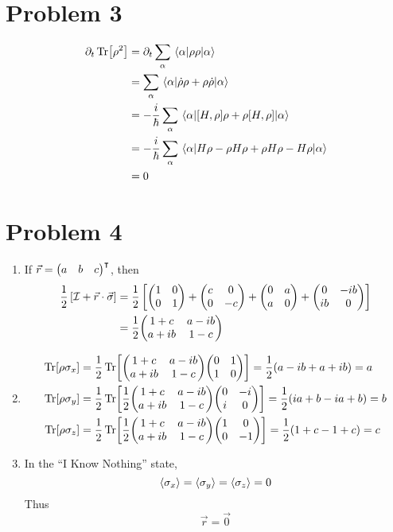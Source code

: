 \documentclass[12pt]{article}
\begin{document}
\section*{Problem 3}
\begin{align*}
    \partial_t \Tr[\rho^2] &= \partial_t\sum_\alpha \mel{\alpha}{\rho\rho}{\alpha} \\
    &= \sum_\alpha \mel{\alpha}{\dot{\rho}\rho + \rho\dot{\rho}}{\alpha} \\
    &= -\frac{i}{\hbar}\sum_\alpha \mel{\alpha}{\comm{H}{\rho}\rho + \rho\comm{H}{\rho}}{\alpha} \\
    &= -\frac{i}{\hbar}\sum_\alpha \mel{\alpha}{H\rho - \rho H \rho + \rho H \rho - H\rho}{\alpha} \\
    &= 0
\end{align*}


\section*{Problem 4}
\begin{enumerate}[label=(\alph*)]
    \item If $\vec{r} = \mqty(a&b&c)^\intercal$, then
    \begin{align*}
        \frac{1}{2}\left[\mathcal{I} + \vec{r}\cdot\vec{\sigma}\right] &= \frac{1}{2}\left[\mqty(1&0\\0&1) + \mqty(c&0\\0&-c) + \mqty(0&a\\a&0) + \mqty(0&-ib\\ib&0)\right] \\
        &= \frac{1}{2}\mqty(1+c & a-ib \\ a+ib & 1-c)
    \end{align*}

    \item
    \begin{align*}
        \Tr[\rho\sigma_x] &= \frac{1}{2}\Tr[\mqty(1+c & a-ib \\ a+ib & 1-c)\mqty(0&1\\1&0)] = \frac{1}{2}(a - ib + a + ib) = a \\
        \Tr[\rho\sigma_y] &= \frac{1}{2}\Tr[\frac{1}{2}\mqty(1+c & a-ib \\ a+ib & 1-c)\mqty(0&-i\\i&0)] = \frac{1}{2}(ia + b - ia + b) = b \\
        \Tr[\rho\sigma_z] &= \frac{1}{2}\Tr[\frac{1}{2}\mqty(1+c & a-ib \\ a+ib & 1-c)\mqty(1&0\\0&-1)] = \frac{1}{2}(1 + c - 1 + c) = c
    \end{align*}

    \item In the ``I Know Nothing'' state,
    \[ \ev{\sigma_x} = \ev{\sigma_y} = \ev{\sigma_z} = 0 \]
    Thus
    \[ \vec{r} = \vec{0} \]
\end{enumerate}
\end{document}

